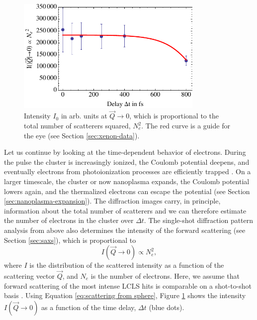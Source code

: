 \begin{figure}
	\centering
		\includegraphics[width=0.80\textwidth]{images/results/number-of-scatterers.pdf}
	\caption[Time-resolved behavior of number of scatterers due to nanoplasma expansion]{Intensity $I_{0}$ in arb. units at $\vec{Q}\rightarrow 0$, which is proportional to the total number of scatterers squared, $N_{e}^{2}$. The red curve is a guide for the eye (see Section \ref{sec:xenon-data}).}
	\label{fig:number-of-scatterer}
\end{figure}
%
Let us continue by looking at the time-dependent behavior of electrons. During the pulse the cluster is increasingly ionized, the Coulomb potential deepens, and eventually electrons from photoionization processes are efficiently trapped \cite{Arbeiter-2011-NJP}. On a larger timescale, the cluster or now nanoplasma expands, the Coulomb potential lowers again, and the thermalized electrons can escape the potential (see Section \ref{sec:nanoplasma-expansion}). The diffraction images carry, in principle, information about the total number of scatterers and we can therefore estimate the number of electrons in the cluster over $\Delta t$. The single-shot diffraction pattern analysis from above also determines the intensity of the forward scattering (see Section \ref{sec:saxs}), which is proportional to
\begin{equation}{}
I\left(\vec{Q}\rightarrow 0\right) \propto N_{e}^{2},
\label{eq:intensity-prop-to-electrons}
\end{equation}
where $I$ is the distribution of the scattered intensity as a function of the scattering vector $\vec{Q}$, and $N_{e}$ is the number of electrons. Here, we assume that forward scattering of the most intense LCLS hits is comparable on a shot-to-shot basis \cite{Gorkhover-2012-PRL}. Using Equation \eqref{eq:scattering from sphere}, Figure \ref{fig:number-of-scatterer} shows the intensity $I\left(\vec{Q}\rightarrow 0\right)$ as a function of the time delay, $\Delta t$ (blue dots).
